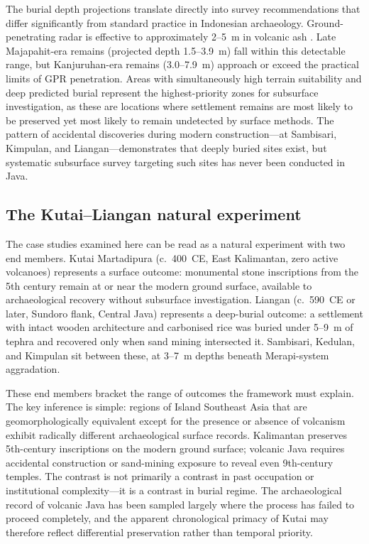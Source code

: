 \documentclass[12pt,a4paper]{article}
\begin{document}
The burial depth projections translate directly into survey recommendations that differ significantly from standard practice in Indonesian archaeology. Ground-penetrating radar is effective to approximately 2--5~m in volcanic ash \citep{conyers2004}. Late Majapahit-era remains (projected depth 1.5--3.9~m) fall within this detectable range, but Kanjuruhan-era remains (3.0--7.9~m) approach or exceed the practical limits of GPR penetration. Areas with simultaneously high terrain suitability and deep predicted burial represent the highest-priority zones for subsurface investigation, as these are locations where settlement remains are most likely to be preserved yet most likely to remain undetected by surface methods. The pattern of accidental discoveries during modern construction---at Sambisari, Kimpulan, and Liangan---demonstrates that deeply buried sites exist, but systematic subsurface survey targeting such sites has never been conducted in Java.

\subsection{The Kutai--Liangan natural experiment}

The case studies examined here can be read as a natural experiment with two end members. Kutai Martadipura (c.~400~CE, East Kalimantan, zero active volcanoes) represents a surface outcome: monumental stone inscriptions from the 5th century remain at or near the modern ground surface, available to archaeological recovery without subsurface investigation. Liangan (c.~590~CE or later, Sundoro flank, Central Java) represents a deep-burial outcome: a settlement with intact wooden architecture and carbonised rice was buried under 5--9~m of tephra and recovered only when sand mining intersected it. Sambisari, Kedulan, and Kimpulan sit between these, at 3--7~m depths beneath Merapi-system aggradation.

These end members bracket the range of outcomes the framework must explain. The key inference is simple: regions of Island Southeast Asia that are geomorphologically equivalent except for the presence or absence of volcanism exhibit radically different archaeological surface records. Kalimantan preserves 5th-century inscriptions on the modern ground surface; volcanic Java requires accidental construction or sand-mining exposure to reveal even 9th-century temples. The contrast is not primarily a contrast in past occupation or institutional complexity---it is a contrast in burial regime. The archaeological record of volcanic Java has been sampled largely where the process has failed to proceed completely, and the apparent chronological primacy of Kutai may therefore reflect differential preservation rather than temporal priority.
\end{document}
